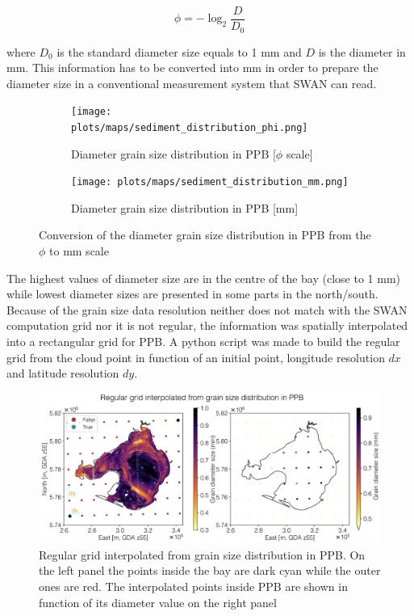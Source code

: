 \documentclass[12pt]{article}
\begin{document}
\begin{equation}
    \phi = - \log_{2}\frac{D}{D_0}
\end{equation}

where $D_0$ is the standard diameter size equals to 1 mm and $D$ is the diameter in mm. This information has to be converted into mm in order to prepare the diameter size in a conventional measurement system that SWAN can read.

\begin{figure}[h]
\centering
\begin{subfigure}{.5\textwidth}
  \centering
  \texttt{[image: plots/maps/sediment\_distribution\_phi.png]}
  \caption{Diameter grain size distribution in PPB [$\phi$ scale]}
  \label{fig:diameter_phi}
\end{subfigure}%
\begin{subfigure}{.5\textwidth}
  \centering
  \texttt{[image: plots/maps/sediment\_distribution\_mm.png]}
  \caption{Diameter grain size distribution in PPB [mm]}
  \label{fig:diameter_mm}
\end{subfigure}
\caption{Conversion of the diameter grain size distribution in PPB from the $\phi$ to mm scale }
\label{fig:diameter_PPB}
\end{figure}

The highest values of diameter size are in the centre of the bay (close to 1 mm) while lowest diameter sizes are presented in some parts in the north/south. Because of the grain size data resolution neither does not match with the SWAN computation grid nor it is not regular, the information was spatially interpolated into a rectangular grid for PPB. A python script was made to build the regular grid from the cloud point in function of an initial point, longitude resolution $dx$ and latitude resolution $dy$.

\begin{figure}[h]
    \centering
    \includegraphics[scale=0.45]{plots/maps/interpolated_D.png}
    \caption{Regular grid interpolated from grain size distribution in PPB. On the left panel the points inside the bay are dark cyan while the outer ones are red. The interpolated points inside PPB are shown in function of its diameter value on the right panel}
    \label{fig:interpolated_D}
\end{figure}
\end{document}
